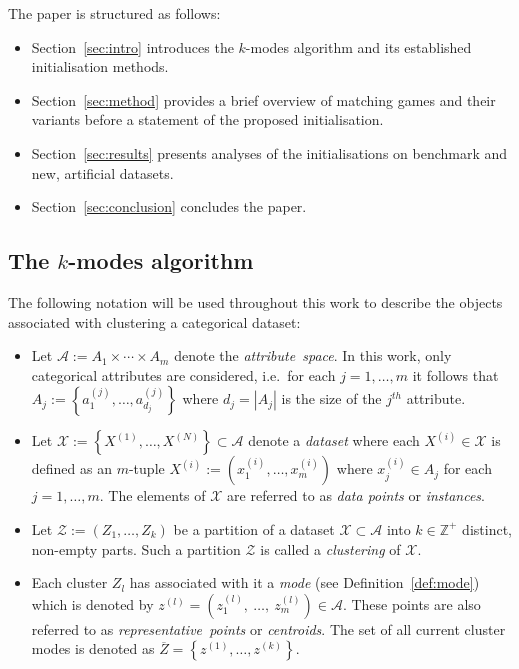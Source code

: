 \documentclass[11pt]{article}
\begin{document}
The paper is structured as follows:
\begin{itemize}
    \item Section~\ref{sec:intro} introduces the \(k\)-modes algorithm and its
        established initialisation methods.
    \item Section~\ref{sec:method} provides a brief overview of
        matching games and their variants before a statement of the proposed
        initialisation.
    \item Section~\ref{sec:results} presents analyses of the initialisations
        on benchmark and new, artificial datasets.
    \item Section~\ref{sec:conclusion} concludes the paper.
\end{itemize}


\subsection{The \(k\)-modes algorithm}\label{subsec:kmodes}

The following notation will be used throughout this work to describe the objects
associated with clustering a categorical dataset:

\begin{itemize}
    \item Let \(\mathcal{A} := A_1 \times \cdots \times A_m\) denote the
        \emph{attribute~space}. In this work, only categorical attributes are
        considered, i.e.\ for each \(j = 1, \ldots, m\) it follows that \(A_j :=
        \left\{a_1^{(j)}, \ldots, a_{d_j}^{(j)}\right\}\) where \(d_j = |A_j|\)
        is the size of the \(j^{th}\) attribute.

    \item Let \(\mathcal{X} := \left\{X^{(1)}, \ldots, X^{(N)}\right\} \subset
        \mathcal{A}\) denote a \emph{dataset} where each \(X^{(i)} \in
        \mathcal{X}\) is defined as an \(m\)-tuple \(X^{(i)} := \left(x_1^{(i)},
        \ldots, x_m^{(i)}\right)\) where \(x_j^{(i)} \in A_j\) for each \(j = 1,
        \ldots, m\). The elements of \(\mathcal{X}\) are referred to as
        \emph{data points} or \emph{instances}.
    \item Let \(\mathcal{Z} := \left(Z_1, \ldots, Z_k\right)\) be a partition
        of a dataset \(\mathcal{X} \subset \mathcal A\) into \(k \in
        \mathbb{Z}^{+}\) distinct, non-empty parts. Such a partition
        \(\mathcal{Z}\) is called a \emph{clustering} of \(\mathcal{X}\).

    \item Each cluster \(Z_l\) has associated with it a
        \emph{mode} (see Definition~\ref{def:mode}) which is
        denoted by \(z^{(l)} = \left(z_1^{(l)},~\ldots,~z_m^{(l)}\right) \in
        \mathcal{A}\).  These points are also referred to as
        \emph{representative~points} or \emph{centroids}. The set of all current
        cluster modes is denoted as \(\overline Z = \left\{z^{(1)}, \ldots,
        z^{(k)}\right\}\).
\end{itemize}
\end{document}
